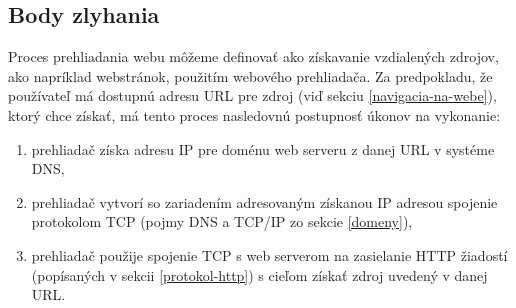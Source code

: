 
\pagebreak

\subsection{Body zlyhania}
\label{body-zlyhania}

Proces prehliadania webu môžeme definovať ako získavanie vzdialených zdrojov, ako napríklad webstránok, použitím webového prehliadača.
Za predpokladu, že používateľ má dostupnú adresu URL pre zdroj (viď sekciu \ref{navigacia-na-webe}), 
ktorý chce získať, má tento proces nasledovnú postupnosť úkonov na vykonanie:

\begin{enumerate}
    \item prehliadač získa adresu IP pre doménu web serveru z danej URL v systéme DNS,
    
    \item prehliadač vytvorí so zariadením adresovaným získanou IP adresou spojenie protokolom TCP 
    (pojmy DNS a TCP/IP zo sekcie \ref{domeny}),
    
    \item prehliadač použije spojenie TCP s web serverom na zasielanie HTTP žiadostí 
    (popísaných v sekcii \ref{protokol-http}) s cieľom získať zdroj uvedený v danej URL.
\end{enumerate}

